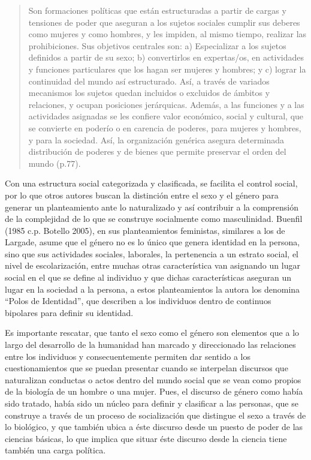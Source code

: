 \begin{quote}
    Son formaciones políticas que están estructuradas a partir de cargas y
    tensiones de poder que aseguran a los sujetos sociales cumplir sus deberes
    como mujeres y como hombres, y les impiden, al mismo tiempo, realizar
    las prohibiciones.
    Sus objetivos centrales son: a) Especializar a los sujetos definidos a partir de
    su sexo;
    b) convertirlos en expertas/os, en actividades y funciones particulares
    que los hagan ser mujeres y hombres;
    y c) lograr la continuidad del mundo así estructurado.
    Así, a través de variados mecanismos los sujetos quedan incluidos o excluidos de
    ámbitos y relaciones, y ocupan posiciones jerárquicas.
    Además, a las funciones y a las actividades asignadas se les confiere valor
    económico, social y cultural, que se convierte en poderío o en carencia de
    poderes, para mujeres y hombres, y para la sociedad.
    Así, la organización genérica asegura determinada distribución de poderes y de
    bienes que permite preservar el orden del mundo (p.77).
\end{quote}

Con una estructura social categorizada y clasificada, se facilita el control
social, por lo que otros autores buscan la distinción entre el sexo y el género
para generar un planteamiento ante lo naturalizado y así contribuir a la
comprensión de la complejidad de lo que se construye socialmente como
masculinidad.
Buenfil (1985 c.p. Botello 2005), en sus planteamientos feministas, similares
a los de Largade, asume que el género no es lo único que genera identidad en la
persona, sino que sus actividades sociales, laborales, la pertenencia a un
estrato social, el nivel de escolarización, entre muchas otras característica
van asignando un lugar social en el que se define al individuo y que dichas
características aseguran un lugar en la sociedad a la persona, a estos
planteamientos la autora los denomina “Polos de Identidad”, que describen a los
individuos dentro de continuos bipolares para definir su identidad.

Es importante rescatar, que tanto el sexo como el género son elementos que a lo
largo del desarrollo de la humanidad han marcado y direccionado las relaciones
entre los individuos y consecuentemente permiten dar sentido a los
cuestionamientos que se puedan presentar cuando se interpelan discursos que
naturalizan conductas o actos dentro del mundo social que se vean como propios
de la biología de un hombre o una mujer.
Pues, el discurso de género como había sido tratado, había sido un núcleo para
definir y clasificar a las personas, que se construye a través de un proceso de
socialización que distingue el sexo a través de lo biológico, y que también
ubica a éste discurso desde un puesto de poder de las ciencias básicas, lo que
implica que situar éste discurso desde la ciencia tiene también una carga
política.

